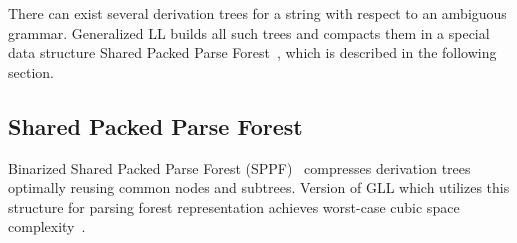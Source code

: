 %
%
%

There can exist several derivation trees for a string with respect to an ambiguous grammar.
Generalized LL builds all such trees and compacts them in a special data structure Shared Packed Parse Forest~\cite{SPPF}, which is described in the following section.

\subsection{Shared Packed Parse Forest}

Binarized Shared Packed Parse Forest (SPPF)~\cite{brnglr} compresses derivation trees optimally reusing common nodes and subtrees.
Version of GLL which utilizes this structure for parsing forest representation achieves worst-case cubic space complexity~\cite{gllParsingTree}.

